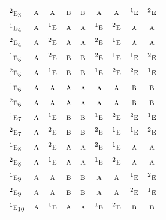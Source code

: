 \documentclass[10pt,a4paper]{article}
\numberwithin{equation}{section}
\newcommand{\irr}[1]{\text{\normalfont\scshape #1}}
\newcommand{\conjpair}[1]{{}^{#1}}
\begin{document}
{\begin{longtable}{@{}lcccccccc@{}}
$\conjpair{2}\irr{e}_{3}$ & $\irr{a}$ & $\irr{a}$ & $\irr{b}$ & $\irr{b}$ & $\irr{a}$ & $\irr{a}$ & $\conjpair{1}\irr{e}$ & $\conjpair{2}\irr{e}$\\
$\conjpair{1}\irr{e}_{4}$ & $\irr{a}$ & $\conjpair{1}\irr{e}$ & $\irr{a}$ & $\irr{a}$ & $\conjpair{1}\irr{e}$ & $\conjpair{2}\irr{e}$ & $\irr{a}$ & $\irr{a}$\\
$\conjpair{2}\irr{e}_{4}$ & $\irr{a}$ & $\conjpair{2}\irr{e}$ & $\irr{a}$ & $\irr{a}$ & $\conjpair{2}\irr{e}$ & $\conjpair{1}\irr{e}$ & $\irr{a}$ & $\irr{a}$\\
$\conjpair{1}\irr{e}_{5}$ & $\irr{a}$ & $\conjpair{2}\irr{e}$ & $\irr{b}$ & $\irr{b}$ & $\conjpair{2}\irr{e}$ & $\conjpair{1}\irr{e}$ & $\conjpair{1}\irr{e}$ & $\conjpair{2}\irr{e}$\\
$\conjpair{2}\irr{e}_{5}$ & $\irr{a}$ & $\conjpair{1}\irr{e}$ & $\irr{b}$ & $\irr{b}$ & $\conjpair{1}\irr{e}$ & $\conjpair{2}\irr{e}$ & $\conjpair{2}\irr{e}$ & $\conjpair{1}\irr{e}$\\
$\conjpair{1}\irr{e}_{6}$ & $\irr{a}$ & $\irr{a}$ & $\irr{a}$ & $\irr{a}$ & $\irr{a}$ & $\irr{a}$ & $\irr{b}$ & $\irr{b}$\\
$\conjpair{2}\irr{e}_{6}$ & $\irr{a}$ & $\irr{a}$ & $\irr{a}$ & $\irr{a}$ & $\irr{a}$ & $\irr{a}$ & $\irr{b}$ & $\irr{b}$\\
$\conjpair{1}\irr{e}_{7}$ & $\irr{a}$ & $\conjpair{1}\irr{e}$ & $\irr{b}$ & $\irr{b}$ & $\conjpair{1}\irr{e}$ & $\conjpair{2}\irr{e}$ & $\conjpair{2}\irr{e}$ & $\conjpair{1}\irr{e}$\\
$\conjpair{2}\irr{e}_{7}$ & $\irr{a}$ & $\conjpair{2}\irr{e}$ & $\irr{b}$ & $\irr{b}$ & $\conjpair{2}\irr{e}$ & $\conjpair{1}\irr{e}$ & $\conjpair{1}\irr{e}$ & $\conjpair{2}\irr{e}$\\
$\conjpair{1}\irr{e}_{8}$ & $\irr{a}$ & $\conjpair{2}\irr{e}$ & $\irr{a}$ & $\irr{a}$ & $\conjpair{2}\irr{e}$ & $\conjpair{1}\irr{e}$ & $\irr{a}$ & $\irr{a}$\\
$\conjpair{2}\irr{e}_{8}$ & $\irr{a}$ & $\conjpair{1}\irr{e}$ & $\irr{a}$ & $\irr{a}$ & $\conjpair{1}\irr{e}$ & $\conjpair{2}\irr{e}$ & $\irr{a}$ & $\irr{a}$\\
$\conjpair{1}\irr{e}_{9}$ & $\irr{a}$ & $\irr{a}$ & $\irr{b}$ & $\irr{b}$ & $\irr{a}$ & $\irr{a}$ & $\conjpair{1}\irr{e}$ & $\conjpair{2}\irr{e}$\\
$\conjpair{2}\irr{e}_{9}$ & $\irr{a}$ & $\irr{a}$ & $\irr{b}$ & $\irr{b}$ & $\irr{a}$ & $\irr{a}$ & $\conjpair{2}\irr{e}$ & $\conjpair{1}\irr{e}$\\
$\conjpair{1}\irr{e}_{10}$ & $\irr{a}$ & $\conjpair{1}\irr{e}$ & $\irr{a}$ & $\irr{a}$ & $\conjpair{1}\irr{e}$ & $\conjpair{2}\irr{e}$ & $\irr{b}$ & $\irr{b}$\\

\end{longtable}}
\end{document}
